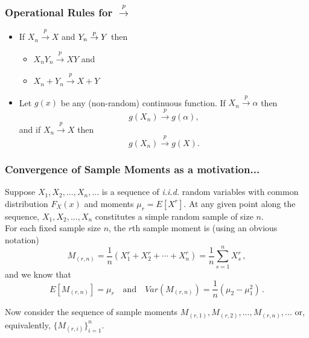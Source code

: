 \documentclass[notes=show,smaller,handout]{beamer}\usepackage[]{graphicx}\usepackage[]{color}
\newenvironment{stepitemize}{\begin{itemize}[<+->]}{\end{itemize} }
\begin{document}
\begin{frame}%

\frametitle{Operational Rules for $\overset{p}{\rightarrow }$}

\begin{stepitemize}
\item If $X_{n}\overset{p}{\rightarrow }X $ and $Y_{n}\overset{p}{%
\rightarrow }Y $ then  \vspace{0.3cm}

\begin{stepitemize}
\item $X_{n}Y_{n}\overset{p}{\rightarrow }X Y$ and  \vspace{0.3cm}

\item $X_{n}+Y_{n}\overset{p}{\rightarrow }X +Y$
\end{stepitemize}

 \vspace{0.6cm}

\item Let $g\left( x\right) $ be any (non-random) continuous function. If $%
X_{n}\overset{p}{\rightarrow }\alpha $ then
$$
g\left( X_{n}\right) \overset{p}{\rightarrow }g\left( \alpha \right),
$$
and if $X_{n}\overset{p}{\rightarrow }X $ then
$$g\left( X_{n}\right) \overset{p}{\rightarrow }g\left( X \right).
$$

\end{stepitemize}


\end{frame}%

\begin{frame}%

\frametitle{Convergence of Sample Moments as a motivation...}

Suppose $X_{1},X_{2},...,X_{n},...$ is a sequence of \textit{i.i.d.} random variables with common distribution $F_X(x)$ and moments $\mu_r=E
[X^r]$. At any given point along the sequence, $X_{1},X_{2},...,X_{n}$ constitutes a simple random sample of size $n$. \\

For each fixed sample size $n$, the $r$th sample moment is (using an obvious notation)
\begin{equation*}
M_{(r,n)}=\frac{1}{n}\left( X_{1}^r+X_{2}^r+\cdots +X_{n}^r\right)=\frac{1}{n}\sum_{s=1}^nX_s^r\,,
\end{equation*}
and we know that \vspace{0.25cm}
$$
E[M_{(r,n)}]=\mu_r\quad\text{and}\quad Var(M_{(r,n)})=\frac{1}{n}(\mu_{2}-\mu_1^2)\,.
$$
\vspace{0.25cm}

Now consider the sequence of sample moments $M_{(r,1)},M_{(r,2)},...,M_{(r,n)},...$ or, equivalently, $\{M_{(r,i)}\}_{i=1}^{n}$.


\end{frame}%
\end{document}
